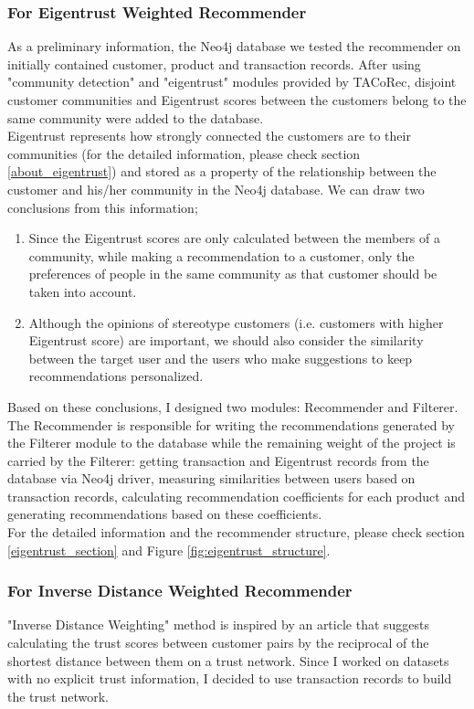 \subsubsection{For Eigentrust Weighted Recommender}
As a preliminary information, the Neo4j database we tested the recommender on initially contained customer, product and transaction records. After using "community detection" and "eigentrust" modules provided by TACoRec, disjoint customer communities and Eigentrust scores between the customers belong to the same community were added to the database.\\

Eigentrust represents how strongly connected the customers are to their communities (for the detailed information, please check section \ref{about_eigentrust}) and stored as a property of the relationship between the customer and his/her community in the Neo4j database. We can draw two conclusions from this information;
\begin{enumerate}
	\item Since the Eigentrust scores are only calculated between the members of a community, while making a recommendation to a customer, only the preferences of people in the same community as that customer should be taken into account.
	\item Although the opinions of stereotype customers (i.e. customers with higher Eigentrust score) are important, we should also consider the similarity between the target user and the users who make suggestions to keep recommendations personalized.
\end{enumerate}
Based on these conclusions, I designed two modules: Recommender and Filterer. The Recommender is responsible for writing the recommendations generated by the Filterer module to the database while the remaining weight of the project is carried by the Filterer: getting transaction and Eigentrust records from the database via Neo4j driver, measuring similarities between users based on transaction records, calculating recommendation coefficients for each product and generating recommendations based on these coefficients. \\

For the detailed information and the recommender structure, please check section \ref{eigentrust_section} and Figure \ref{fig:eigentrust_structure}.
\subsubsection{For Inverse Distance Weighted Recommender}
"Inverse Distance Weighting" method is inspired by an article\cite{inverse_article} that suggests calculating the trust scores between customer pairs by the reciprocal of the shortest distance between them on a trust network. Since I worked on datasets with no explicit trust information, I decided to use transaction records to build the trust network. \\

